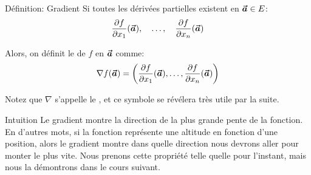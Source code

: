 \documentclass[a4paper]{article}
\begin{document}
\begin{parag}{Définition: Gradient}
    Si toutes les dérivées partielles existent en $\bm{\protect\vec{a}} \in E$: 
    \[\frac{\partial f}{\partial x_1}\left(\bvec{a}\right), \mathspace \ldots, \mathspace \frac{\partial f}{\partial x_n}\left(\bvec{a}\right)\]
    
    Alors, on définit le  de $f$ en $\bm{\protect\vec{a}}$ comme: 
    \[\nabla f\left(\bvec{a}\right) = \left(\frac{\partial f}{\partial x_1}\left(\bvec{a}\right), \ldots, \frac{\partial f}{\partial x_n}\left(\bvec{a}\right)\right)\]
    
    Notez que $\nabla$ s'appelle le , et ce symbole se révélera très utile par la suite.

    \begin{subparag}{Intuition}
        Le gradient montre la direction de la plus grande pente de la fonction. En d'autres mots, si la fonction représente une altitude en fonction d'une position, alors le gradient montre dans quelle direction nous devrons aller pour monter le plus vite. Nous prenons cette propriété telle quelle pour l'instant, mais nous la démontrons dans le cours suivant.
    \end{subparag}
\end{parag}
\end{document}
